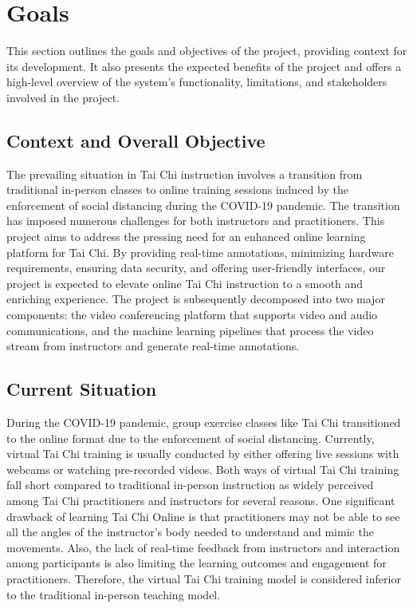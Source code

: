 \documentclass[12pt]{article}
\begin{document}
\section{Goals}
This section outlines the goals and objectives of the project, providing context for its development. It also presents the expected benefits of the project and offers a high-level overview of the system’s functionality, limitations, and stakeholders involved in the project.
\subsection{Context and Overall Objective}
The prevailing situation in Tai Chi instruction involves a transition from traditional in-person classes to online training sessions induced by the enforcement of social distancing during the COVID-19 pandemic. The transition has imposed numerous challenges for both instructors and practitioners. This project aims to address the pressing need for an enhanced online learning platform for Tai Chi. By providing real-time annotations, minimizing hardware requirements, ensuring data security, and offering user-friendly interfaces, our project is expected to elevate online Tai Chi instruction to a smooth and enriching experience. The project is subsequently decomposed into two major components: the video conferencing platform that supports video and audio communications, and the machine learning pipelines that process the video stream from instructors and generate real-time annotations.

\subsection{Current Situation}
During the COVID-19 pandemic, group exercise classes like Tai Chi transitioned to the online format due to the enforcement of social distancing. Currently, virtual Tai Chi training is usually conducted by either offering live sessions with webcams or watching pre-recorded videos. Both ways of virtual Tai Chi training fall short compared to traditional in-person instruction as widely perceived among Tai Chi practitioners and instructors for several reasons. One significant drawback of learning Tai Chi Online is that practitioners may not be able to see all the angles of the instructor’s body needed to understand and mimic the movements. Also, the lack of real-time feedback from instructors and interaction among participants is also limiting the learning outcomes and engagement for practitioners. Therefore, the virtual Tai Chi training model is considered inferior to the traditional in-person teaching model.
\end{document}
